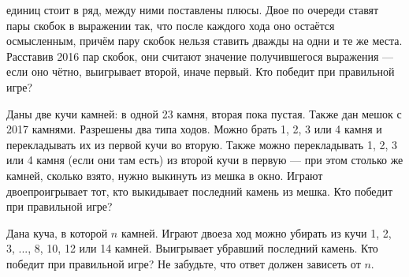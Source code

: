 ﻿
\begin{itemize}

 единиц стоит в ряд, между ними поставлены плюсы. Двое по очереди ставят пары скобок в выражении так, что после каждого хода оно остаётся осмысленным, причём пару скобок нельзя ставить дважды на одни и те же места. Расставив 2016 пар скобок, они считают значение получившегося выражения — если оно чётно, выигрывает второй, иначе первый. Кто победит при правильной игре?

\itB Даны две кучи камней: в одной 23 камня, вторая пока пустая. Также дан мешок с 2017 камнями. Разрешены два типа ходов. Можно брать 1, 2, 3 или 4 камня и перекладывать их из первой кучи во вторую. Также можно перекладывать 1, 2, 3 или 4 камня (если они там есть) из второй кучи в первую — при этом столько же камней, сколько взято, нужно выкинуть из мешка в окно. Играют двое\scolon проигрывает тот, кто выкидывает последний камень из мешка. Кто победит при правильной игре?

\itC Дана куча, в которой $n$ камней. Играют двое\scolon за ход можно убирать из кучи 1, 2, 3, ..., 8, 10, 12 или 14 камней. Выигрывает убравший последний камень. Кто победит при правильной игре? Не забудьте, что ответ должен зависеть от $n$.
\end{itemize}